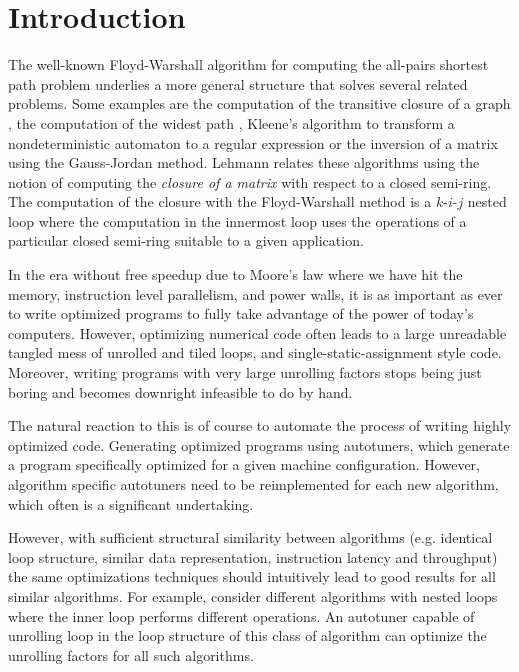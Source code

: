 \section{Introduction}\label{sec:intro}
The well-known Floyd-Warshall algorithm \cite{floyd62shortest} for computing the all-pairs shortest path problem
underlies a more general structure that solves several related problems. Some examples are the computation of the
transitive closure of a graph \cite{warshall62boolean, roy1959transitivite}, the computation of the widest path
\cite{pollack60widest}, Kleene's algorithm to transform a nondeterministic automaton to a regular expression
\cite{kleene1956representation} or the inversion of a matrix using the Gauss-Jordan method. Lehmann
\cite{lehmann77algebraic} relates these algorithms using the notion of computing the \emph{closure of a matrix}
with respect to a closed semi-ring.
The computation of the closure with the Floyd-Warshall method is a $k$-$i$-$j$ nested loop where the computation in
the innermost loop uses the operations of a particular closed semi-ring suitable to a given application.

In the era without free speedup due to Moore's law where we have hit the memory, instruction level parallelism, and power walls, it is
as important as ever to write optimized programs to fully take advantage of the power of today's computers.
However, optimizing numerical code often leads to a large
unreadable tangled mess of unrolled and tiled loops, and single-static-assignment style code. Moreover, writing programs with very large
unrolling factors stops being just boring and becomes downright infeasible to do by hand.

The natural reaction to this is of course to automate the process of writing highly optimized code. Generating
optimized programs using autotuners, which generate a program specifically optimized for a given machine
configuration. However, algorithm specific autotuners need to be reimplemented for
each new algorithm, which often is a significant undertaking.

However, with sufficient structural similarity between algorithms (e.g. identical loop structure,
similar data representation, instruction latency and throughput) the same optimizations techniques should intuitively
lead to good results for all similar algorithms. For example, consider different algorithms with nested loops
where the inner loop performs different operations. An autotuner capable of unrolling loop in the
loop structure of this class of algorithm can optimize the unrolling factors for all such algorithms.

